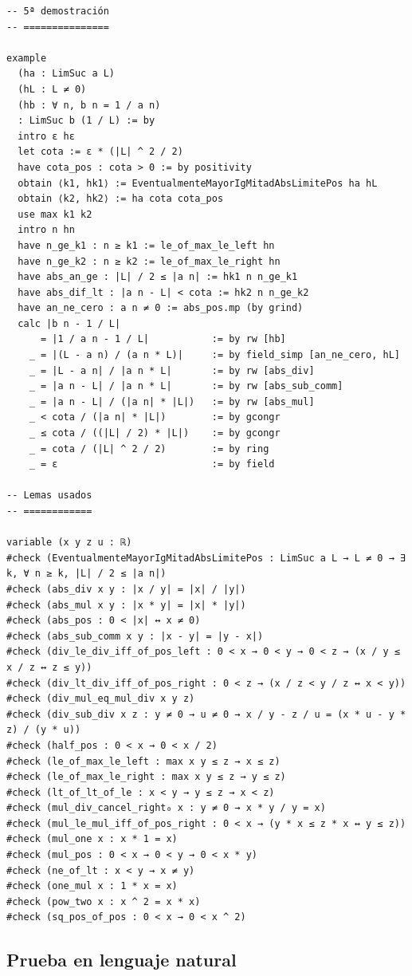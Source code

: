 \begin{verbatim}
-- 5ª demostración
-- ===============

example
  (ha : LimSuc a L)
  (hL : L ≠ 0)
  (hb : ∀ n, b n = 1 / a n)
  : LimSuc b (1 / L) := by
  intro ε hε
  let cota := ε * (|L| ^ 2 / 2)
  have cota_pos : cota > 0 := by positivity
  obtain ⟨k1, hk1⟩ := EventualmenteMayorIgMitadAbsLimitePos ha hL
  obtain ⟨k2, hk2⟩ := ha cota cota_pos
  use max k1 k2
  intro n hn
  have n_ge_k1 : n ≥ k1 := le_of_max_le_left hn
  have n_ge_k2 : n ≥ k2 := le_of_max_le_right hn
  have abs_an_ge : |L| / 2 ≤ |a n| := hk1 n n_ge_k1
  have abs_dif_lt : |a n - L| < cota := hk2 n n_ge_k2
  have an_ne_cero : a n ≠ 0 := abs_pos.mp (by grind)
  calc |b n - 1 / L|
      = |1 / a n - 1 / L|           := by rw [hb]
    _ = |(L - a n) / (a n * L)|     := by field_simp [an_ne_cero, hL]
    _ = |L - a n| / |a n * L|       := by rw [abs_div]
    _ = |a n - L| / |a n * L|       := by rw [abs_sub_comm]
    _ = |a n - L| / (|a n| * |L|)   := by rw [abs_mul]
    _ < cota / (|a n| * |L|)        := by gcongr
    _ ≤ cota / ((|L| / 2) * |L|)    := by gcongr
    _ = cota / (|L| ^ 2 / 2)        := by ring
    _ = ε                           := by field

-- Lemas usados
-- ============

variable (x y z u : ℝ)
#check (EventualmenteMayorIgMitadAbsLimitePos : LimSuc a L → L ≠ 0 → ∃ k, ∀ n ≥ k, |L| / 2 ≤ |a n|)
#check (abs_div x y : |x / y| = |x| / |y|)
#check (abs_mul x y : |x * y| = |x| * |y|)
#check (abs_pos : 0 < |x| ↔ x ≠ 0)
#check (abs_sub_comm x y : |x - y| = |y - x|)
#check (div_le_div_iff_of_pos_left : 0 < x → 0 < y → 0 < z → (x / y ≤ x / z ↔ z ≤ y))
#check (div_lt_div_iff_of_pos_right : 0 < z → (x / z < y / z ↔ x < y))
#check (div_mul_eq_mul_div x y z)
#check (div_sub_div x z : y ≠ 0 → u ≠ 0 → x / y - z / u = (x * u - y * z) / (y * u))
#check (half_pos : 0 < x → 0 < x / 2)
#check (le_of_max_le_left : max x y ≤ z → x ≤ z)
#check (le_of_max_le_right : max x y ≤ z → y ≤ z)
#check (lt_of_lt_of_le : x < y → y ≤ z → x < z)
#check (mul_div_cancel_right₀ x : y ≠ 0 → x * y / y = x)
#check (mul_le_mul_iff_of_pos_right : 0 < x → (y * x ≤ z * x ↔ y ≤ z))
#check (mul_one x : x * 1 = x)
#check (mul_pos : 0 < x → 0 < y → 0 < x * y)
#check (ne_of_lt : x < y → x ≠ y)
#check (one_mul x : 1 * x = x)
#check (pow_two x : x ^ 2 = x * x)
#check (sq_pos_of_pos : 0 < x → 0 < x ^ 2)
\end{verbatim}

\subsection{Prueba en lenguaje natural}

